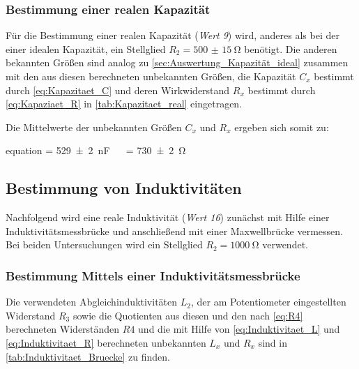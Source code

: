	\subsubsection{Bestimmung einer realen Kapazität}
	\label{sec:Auswertung_Kapazität_real}
		
		Für die Bestimmung einer realen Kapazität (\emph{Wert 9}) wird, anderes als bei der einer idealen Kapazität, ein
		Stellglied $R_{2} = \SI{500(15)}{\ohm}$ benötigt. Die anderen bekannten Größen sind analog zu
		 \cref{sec:Auswertung_Kapazität_ideal} zusammen mit den aus diesen 
		berechneten unbekannten Größen, die Kapazität $C_{x}$ bestimmt durch \cref{eq:Kapazitaet_C} und deren
		 Wirkwiderstand $R_{x}$ bestimmt durch \cref{eq:Kapaziaet_R} in 
		\cref{tab:Kapazitaet_real} eingetragen. 
	
		
		
		Die Mittelwerte der unbekannten Größen $C_{x}$ und $R_{x}$ ergeben sich somit zu:
		\begin{empheq}{equation}
				 = \SI{529(2)}{\nano\farad} \quad\ \ \quad {} = \SI{730(2)}{\ohm}
		\end{empheq}  
	
\subsection{Bestimmung von Induktivitäten}
\label{sec:Auswertung_Induktivität}

	Nachfolgend wird eine reale Induktivität (\emph{Wert 16}) zunächst mit Hilfe einer Induktivitätsmessbrücke
	und anschließend mit einer Maxwellbrücke vermessen. Bei beiden Untersuchungen wird 
	ein Stellglied $R_{2} = \SI{1000}{\ohm}$ verwendet.
	
	\subsubsection{Bestimmung Mittels einer Induktivitätsmessbrücke}
	\label{sec:Auswertung_Induktivität_Messbrücke}
	
		Die verwendeten Abgleichinduktivitäten $L_{2}$, der am Potentiometer eingestellten Widerstand
		$R_{3}$ sowie die Quotienten aus diesen und den nach \cref{eq:R4} berechneten Widerständen $R4$
		und die mit Hilfe von \cref{eq:Induktivitaet_L} und \cref{eq:Induktivitaet_R} berechneten unbekannten $L_{x}$
		 und $R_{x}$ sind in \cref{tab:Induktivitaet_Bruecke} zu finden.    
		
		
		
